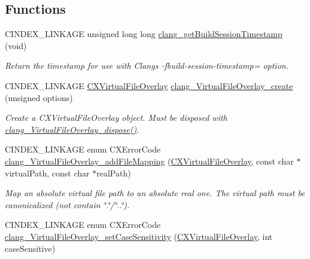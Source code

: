 \subsection*{Functions}
\begin{DoxyCompactItemize}
\item 
\mbox{\label{group__BUILD__SYSTEM_ga49c44b2501c98768d29ad84fdaa3f8f0}} 
C\+I\+N\+D\+E\+X\+\_\+\+L\+I\+N\+K\+A\+GE unsigned long long \mbox{\hyperlink{group__BUILD__SYSTEM_ga49c44b2501c98768d29ad84fdaa3f8f0}{clang\+\_\+get\+Build\+Session\+Timestamp}} (void)
\begin{DoxyCompactList}\small\item\em Return the timestamp for use with Clang\textquotesingle{}s {\ttfamily -\/fbuild-\/session-\/timestamp=} option. \end{DoxyCompactList}\item 
C\+I\+N\+D\+E\+X\+\_\+\+L\+I\+N\+K\+A\+GE \mbox{\hyperlink{group__BUILD__SYSTEM_gae854e36ceb0a02071e557e19f908772d}{C\+X\+Virtual\+File\+Overlay}} \mbox{\hyperlink{group__BUILD__SYSTEM_gac0fc5753287609c4087155c3bab1ba1b}{clang\+\_\+\+Virtual\+File\+Overlay\+\_\+create}} (unsigned options)
\begin{DoxyCompactList}\small\item\em Create a {\ttfamily C\+X\+Virtual\+File\+Overlay} object. Must be disposed with {\ttfamily \mbox{\hyperlink{group__BUILD__SYSTEM_ga118f45b2f96f989fc1f39f3f95973deb}{clang\+\_\+\+Virtual\+File\+Overlay\+\_\+dispose()}}}. \end{DoxyCompactList}\item 
C\+I\+N\+D\+E\+X\+\_\+\+L\+I\+N\+K\+A\+GE enum C\+X\+Error\+Code \mbox{\hyperlink{group__BUILD__SYSTEM_gab5570468498c950cc25f2746765a9cd7}{clang\+\_\+\+Virtual\+File\+Overlay\+\_\+add\+File\+Mapping}} (\mbox{\hyperlink{group__BUILD__SYSTEM_gae854e36ceb0a02071e557e19f908772d}{C\+X\+Virtual\+File\+Overlay}}, const char $\ast$virtual\+Path, const char $\ast$real\+Path)
\begin{DoxyCompactList}\small\item\em Map an absolute virtual file path to an absolute real one. The virtual path must be canonicalized (not contain \char`\"{}.\char`\"{}/\char`\"{}..\char`\"{}). \end{DoxyCompactList}\item 
C\+I\+N\+D\+E\+X\+\_\+\+L\+I\+N\+K\+A\+GE enum C\+X\+Error\+Code \mbox{\hyperlink{group__BUILD__SYSTEM_ga00ca3247ef5f5e3ac504ce13623939e3}{clang\+\_\+\+Virtual\+File\+Overlay\+\_\+set\+Case\+Sensitivity}} (\mbox{\hyperlink{group__BUILD__SYSTEM_gae854e36ceb0a02071e557e19f908772d}{C\+X\+Virtual\+File\+Overlay}}, int case\+Sensitive)

\end{DoxyCompactItemize}

